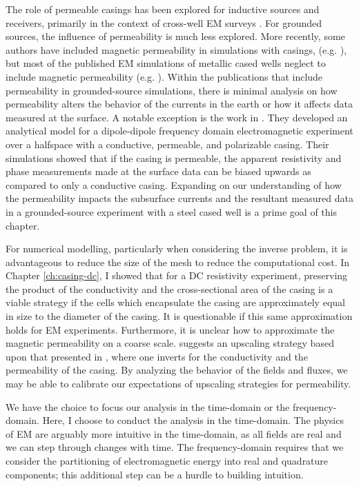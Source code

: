 The role of permeable casings has been explored for inductive sources and receivers, primarily in the context of cross-well EM surveys \citep{Augustin1989, wuhabashy1994, Wilt1996, Becker1997, Lee1998, Lee2005, Kim2006}. For grounded sources, the influence of permeability is much less explored. More recently, some authors have included magnetic permeability in simulations with casings, (e.g. \citep{Kong2009}), but most of the published EM simulations of metallic cased wells neglect to include magnetic permeability (e.g. \citep{Swidinsky2013, Commer2015, Um2015, Fang2017, Puzyrev2017}). Within the publications that include permeability in grounded-source simulations, there is minimal analysis on how permeability alters the behavior of the currents in the earth or how it affects data measured at the surface. A notable exception is the work in \cite{Wait1985, Williams1985}. They developed an analytical model for a dipole-dipole frequency domain electromagnetic experiment over a halfspace with a conductive, permeable, and polarizable casing. Their simulations showed that if the casing is permeable, the apparent resistivity and phase measurements made at the surface data can be biased upwards as compared to only a conductive casing. Expanding on our understanding of how the permeability impacts the subsurface currents and the resultant measured data in a grounded-source experiment with a steel cased well is a prime goal of this chapter.

For numerical modelling, particularly when considering the inverse problem, it is advantageous to reduce the size of the mesh to reduce the computational cost. In Chapter \ref{ch:casing-dc}, I showed that for a DC resistivity experiment, preserving the product of the conductivity and the cross-sectional area of the casing is a viable strategy if the cells which encapsulate the casing are approximately equal in size to the diameter of the casing. It is questionable if this same approximation holds for EM experiments. Furthermore, it is unclear how to approximate the magnetic permeability on a coarse scale. \cite{Schwarzbach2018} suggests an upscaling strategy based upon that presented in \cite{Caudillo-Mata2017}, where one inverts for the conductivity and the permeability of the casing. By analyzing the behavior of the fields and fluxes, we may be able to calibrate our expectations of upscaling strategies for permeability.

We have the choice to focus our analysis in the time-domain or the frequency-domain. Here, I choose to conduct the analysis in the time-domain. The physics of EM are arguably more intuitive in the time-domain, as all fields are real and we can step through changes with time. The frequency-domain requires that we consider the partitioning of electromagnetic energy into real and quadrature components; this additional step can be a hurdle to building intuition.

